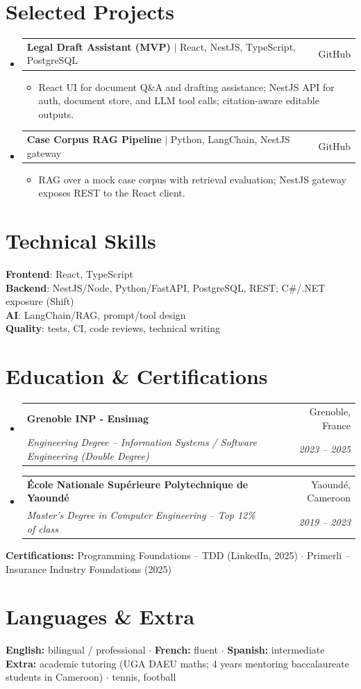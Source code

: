 \documentclass[letterpaper,10.5pt]{article}
\makeatletter
\newcommand{\resumeItem}[1]{\item\small{#1 \vspace{-1.5pt}}}
\newcommand{\resumeSubheading}[4]{
  \vspace{-1pt}\item
    \begin{tabular*}{0.97\textwidth}[t]{l@{\extracolsep{\fill}}r}
      \textbf{#1} & #2 \\
      \textit{\small#3} & \textit{\small #4} \\
    \end{tabular*}\vspace{-5pt}
}
\newcommand{\resumeProjectHeading}[2]{
    \item
    \begin{tabular*}{0.97\textwidth}{l@{\extracolsep{\fill}}r}
      \small#1 & #2 \\
    \end{tabular*}\vspace{-5pt}
}
\newcommand{\resumeSubHeadingListStart}{\begin{itemize}[leftmargin=0.15in, label={}]}
\newcommand{\resumeSubHeadingListEnd}{\end{itemize}}
\newcommand{\resumeItemListStart}{\begin{itemize}[leftmargin=0.18in]}
\newcommand{\resumeItemListEnd}{\end{itemize}\vspace{-3pt}}
\makeatother
\begin{document}
\section{Selected Projects}

\resumeSubHeadingListStart

  \resumeProjectHeading
    {\textbf{Legal Draft Assistant (MVP)} $|$ React, NestJS, TypeScript, PostgreSQL}{GitHub}
    \resumeItemListStart
      \resumeItem{React UI for document Q\&A and drafting assistance; NestJS API for auth, document store, and LLM tool calls; citation-aware editable outputs.}
    \resumeItemListEnd
  \resumeProjectHeading
    {\textbf{Case Corpus RAG Pipeline} $|$ Python, LangChain, NestJS gateway}{GitHub}
    \resumeItemListStart
      \resumeItem{RAG over a mock case corpus with retrieval evaluation; NestJS gateway exposes REST to the React client.}
    \resumeItemListEnd
\resumeSubHeadingListEnd

\section{Technical Skills}

\begin{itemize}[leftmargin=0.15in, label={}]
  \small{\item{
\textbf{Frontend}: React, TypeScript \\
\textbf{Backend}: NestJS/Node, Python/FastAPI, PostgreSQL, REST; C\#/.NET exposure (Shift) \\
\textbf{AI}: LangChain/RAG, prompt/tool design \\
\textbf{Quality}: tests, CI, code reviews, technical writing
  }}
\end{itemize}

\section{Education \& Certifications}

\resumeSubHeadingListStart
  \resumeSubheading
    {Grenoble INP - Ensimag}{Grenoble, France}
    {Engineering Degree -- Information Systems / Software Engineering (Double Degree)}{2023 -- 2025}
  \resumeSubheading
    {\'Ecole Nationale Sup\'erieure Polytechnique de Yaound\'e}{Yaound\'e, Cameroon}
    {Master's Degree in Computer Engineering -- Top 12\% of class}{2019 -- 2023}
\resumeSubHeadingListEnd
\small{
\textbf{Certifications:} Programming Foundations -- TDD (LinkedIn, 2025) $\cdot$ Primerli -- Insurance Industry Foundations (2025)
}

\section{Languages \& Extra}
\small{
\textbf{English:} bilingual / professional $\cdot$ \textbf{French:} fluent $\cdot$ \textbf{Spanish:} intermediate \\
\textbf{Extra:} academic tutoring (UGA DAEU maths; 4 years mentoring baccalaureate students in Cameroon) $\cdot$ tennis, football
}
\end{document}
